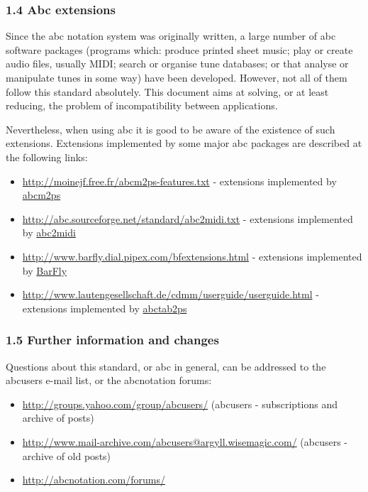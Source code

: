\documentclass[oneside]{book}
\begin{document}
\hypertarget{abc_extensions}{\subsubsection{1.4 Abc
extensions}\label{abc_extensions}}

Since the abc notation system was originally written, a large number of
abc software packages (programs which: produce printed sheet music; play
or create audio files, usually MIDI; search or organise tune databases;
or that analyse or manipulate tunes in some way) have been developed.
However, not all of them follow this standard absolutely. This document
aims at solving, or at least reducing, the problem of incompatibility
between applications.

Nevertheless, when using abc it is good to be aware of the existence of
such extensions. Extensions implemented by some major abc packages are
described at the following links:

\begin{itemize}
\item
  \url{http://moinejf.free.fr/abcm2ps-features.txt} - extensions
  implemented by
  \href{http://abcnotation.com/software\#abcm2ps}{abcm2ps}
\item
  \url{http://abc.sourceforge.net/standard/abc2midi.txt} - extensions
  implemented by
  \href{http://abcnotation.com/software\#abcMIDI}{abc2midi}
\item
  \url{http://www.barfly.dial.pipex.com/bfextensions.html} - extensions
  implemented by \href{http://abcnotation.com/software\#BarFly}{BarFly}
\item
  \url{http://www.lautengesellschaft.de/cdmm/userguide/userguide.html} -
  extensions implemented by
  \href{http://abcnotation.com/software\#abctab2ps}{abctab2ps}
\end{itemize}

\hypertarget{further_information_and_changes}{\subsubsection{1.5 Further
information and changes}\label{further_information_and_changes}}

Questions about this standard, or abc in general, can be addressed to
the abcusers e-mail list, or the abcnotation forums:

\begin{itemize}
\item
  \url{http://groups.yahoo.com/group/abcusers/} (abcusers -
  subscriptions and archive of posts)
\item
  \url{http://www.mail-archive.com/abcusers@argyll.wisemagic.com/}
  (abcusers - archive of old posts)
\item
  \url{http://abcnotation.com/forums/}
\end{itemize}
\end{document}
